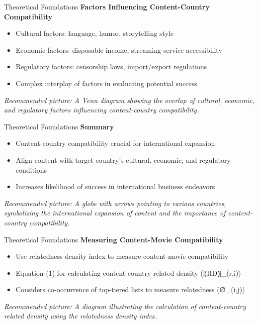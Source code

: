 \documentclass[
  ignorenonframetext,
]{beamer}
\begin{document}
\begin{frame}{Theoretical Foundations}
\protect\hypertarget{theoretical-foundations-8}{}
\textbf{Factors Influencing Content-Country Compatibility}

\begin{itemize}
\item
  Cultural factors: language, humor, storytelling style
\item
  Economic factors: disposable income, streaming service accessibility
\item
  Regulatory factors: censorship laws, import/export regulations
\item
  Complex interplay of factors in evaluating potential success
\end{itemize}

\emph{Recommended picture: A Venn diagram showing the overlap of
cultural, economic, and regulatory factors influencing content-country
compatibility.}
\end{frame}

\begin{frame}{Theoretical Foundations}
\protect\hypertarget{theoretical-foundations-9}{}
\textbf{Summary}

\begin{itemize}
\item
  Content-country compatibility crucial for international expansion
\item
  Align content with target country's cultural, economic, and regulatory
  conditions
\item
  Increases likelihood of success in international business endeavors
\end{itemize}

\emph{Recommended picture: A globe with arrows pointing to various
countries, symbolizing the international expansion of content and the
importance of content-country compatibility.}
\end{frame}

\begin{frame}{Theoretical Foundations}
\protect\hypertarget{theoretical-foundations-10}{}
\textbf{Measuring Content-Movie Compatibility}

\begin{itemize}
\item
  Use relatedness density index to measure content-movie compatibility
\item
  Equation (1) for calculating content-country related density
  (〖RD〗\_(r,i))
\item
  Considers co-occurrence of top-tiered lists to measure relatedness
  (∅\_(i,j))
\end{itemize}

\emph{Recommended picture: A diagram illustrating the calculation of
content-country related density using the relatedness density index.}
\end{frame}
\end{document}
